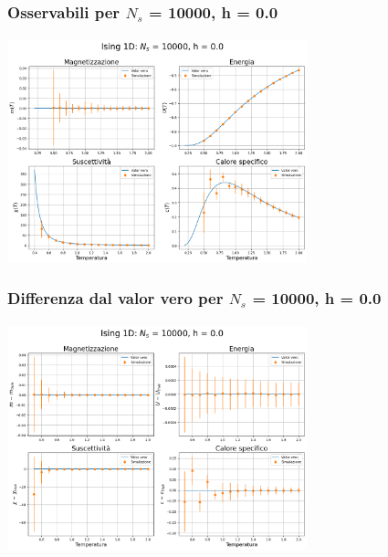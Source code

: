 \begin{frame}
    \frametitle{Osservabili per $N_s$ = 10000, h = 0.0}
    \framesubtitle{}

    \centering
    \includegraphics[width=0.65\textwidth]{Immagini/backupIsing1D/obs_10000_0.0.png}

\end{frame}



\begin{frame}
    \frametitle{Differenza dal valor vero per $N_s$ = 10000, h = 0.0}
    \framesubtitle{}

    \centering
    \includegraphics[width=0.65\textwidth]{Immagini/backupIsing1D/obs_10000_0.0_diff.png}

\end{frame}



